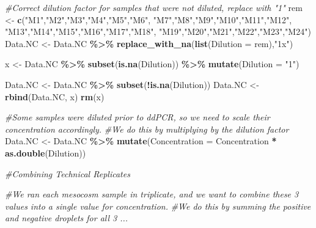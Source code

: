 \documentclass[
]{article}
\newenvironment{Shaded}{\begin{snugshade}}{\end{snugshade}}
\newcommand{\AttributeTok}[1]{\textcolor[rgb]{0.13,0.29,0.53}{#1}}
\newcommand{\CommentTok}[1]{\textcolor[rgb]{0.56,0.35,0.01}{\textit{#1}}}
\newcommand{\FunctionTok}[1]{\textcolor[rgb]{0.13,0.29,0.53}{\textbf{#1}}}
\newcommand{\NormalTok}[1]{#1}
\newcommand{\OtherTok}[1]{\textcolor[rgb]{0.56,0.35,0.01}{#1}}
\newcommand{\SpecialCharTok}[1]{\textcolor[rgb]{0.81,0.36,0.00}{\textbf{#1}}}
\newcommand{\StringTok}[1]{\textcolor[rgb]{0.31,0.60,0.02}{#1}}
\begin{document}
\begin{Shaded}
\begin{Highlighting}[]
\CommentTok{\#Correct dilution factor for samples that were not diluted, replace with "1"}
\NormalTok{rem }\OtherTok{\textless{}{-}} \FunctionTok{c}\NormalTok{(}\StringTok{"M1"}\NormalTok{,}\StringTok{"M2"}\NormalTok{,}\StringTok{"M3"}\NormalTok{,}\StringTok{"M4"}\NormalTok{,}\StringTok{"M5"}\NormalTok{,}\StringTok{"M6"}\NormalTok{,}
         \StringTok{"M7"}\NormalTok{,}\StringTok{"M8"}\NormalTok{,}\StringTok{"M9"}\NormalTok{,}\StringTok{"M10"}\NormalTok{,}\StringTok{"M11"}\NormalTok{,}\StringTok{"M12"}\NormalTok{,}
         \StringTok{"M13"}\NormalTok{,}\StringTok{"M14"}\NormalTok{,}\StringTok{"M15"}\NormalTok{,}\StringTok{"M16"}\NormalTok{,}\StringTok{"M17"}\NormalTok{,}\StringTok{"M18"}\NormalTok{,}
         \StringTok{"M19"}\NormalTok{,}\StringTok{"M20"}\NormalTok{,}\StringTok{"M21"}\NormalTok{,}\StringTok{"M22"}\NormalTok{,}\StringTok{"M23"}\NormalTok{,}\StringTok{"M24"}\NormalTok{)}
\NormalTok{Data.NC }\OtherTok{\textless{}{-}}\NormalTok{ Data.NC }\SpecialCharTok{\%\textgreater{}\%} 
  \FunctionTok{replace\_with\_na}\NormalTok{(}\FunctionTok{list}\NormalTok{(}\AttributeTok{Dilution =}\NormalTok{ rem),}\StringTok{"1x"}\NormalTok{) }

\NormalTok{x }\OtherTok{\textless{}{-}}\NormalTok{ Data.NC }\SpecialCharTok{\%\textgreater{}\%} 
  \FunctionTok{subset}\NormalTok{(}\FunctionTok{is.na}\NormalTok{(Dilution)) }\SpecialCharTok{\%\textgreater{}\%} 
  \FunctionTok{mutate}\NormalTok{(}\AttributeTok{Dilution =} \StringTok{"1"}\NormalTok{)}

\NormalTok{Data.NC }\OtherTok{\textless{}{-}}\NormalTok{ Data.NC }\SpecialCharTok{\%\textgreater{}\%} \FunctionTok{subset}\NormalTok{(}\SpecialCharTok{!}\FunctionTok{is.na}\NormalTok{(Dilution))}
\NormalTok{Data.NC }\OtherTok{\textless{}{-}} \FunctionTok{rbind}\NormalTok{(Data.NC, x)}
\FunctionTok{rm}\NormalTok{(x)}

\CommentTok{\#Some samples were diluted prior to ddPCR, so we need to scale their concentration accordingly.}
\CommentTok{\#We do this by multiplying by the dilution factor}
\NormalTok{Data.NC }\OtherTok{\textless{}{-}}\NormalTok{ Data.NC }\SpecialCharTok{\%\textgreater{}\%} \FunctionTok{mutate}\NormalTok{(}\AttributeTok{Concentration =}\NormalTok{ Concentration }\SpecialCharTok{*} \FunctionTok{as.double}\NormalTok{(Dilution))}

\CommentTok{\#Combining Technical Replicates}

\CommentTok{\#We ran each mesocosm sample in triplicate, and we want to combine these 3 values into a single value for concentration. }
\CommentTok{\#We do this by summing the positive and negative droplets for all 3 ...}


\end{Highlighting}
\end{Shaded}
\end{document}
